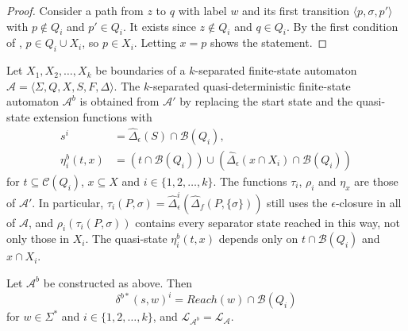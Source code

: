 \begin{proof}
  Consider a path from $z$ to $q$ with label $w$ and its first transition $\langle p, \sigma,
  p' \rangle$ with $p \not\in Q_i$ and $p' \in Q_i$. It exists since $z \not\in Q_i$ and $q
  \in Q_i$. By the first condition of , $p \in Q_i \cup X_i$, so $p \in
  X_i$. Letting $x = p$ shows the statement.
\end{proof}

Let $X_1, X_2, \ldots, X_k$ be boundaries of a $k$-separated finite-state automaton
$\mathcal{A} = \langle \Sigma, Q, X, S, F, \Delta \rangle$. The $k$-separated
quasi-deterministic finite-state automaton $\mathcal{A}^b$ is obtained from $\mathcal{A}'$ by
replacing the start state and the quasi-state extension functions with
\begin{align*}
  s^i &= \hat{\Delta}_\epsilon(S) \cap \mathcal{B}(Q_i),\\
  \eta_i^b(t, x) &= (t \cap \mathcal{B}(Q_i)) \cup (\hat{\Delta}_\epsilon(x \cap X_i) \cap
  \mathcal{B}(Q_i))
\end{align*}
for $t \subseteq \mathcal{C}(Q_i)$, $x \subseteq X$ and $i \in \{ 1, 2, \ldots, k \}$. The
functions $\tau_i$, $\rho_i$ and $\eta_x$ are those of $\mathcal{A}'$. In particular,
$\tau_i(P, \sigma) = \hat{\Delta}_\epsilon^i(\hat{\Delta}_f(P, \{ \sigma \}))$ still uses
the $\epsilon$-closure in all of $\mathcal{A}$, and $\rho_i(\tau_i(P, \sigma))$ contains every
separator state reached in this way, not only those in $X_i$. The quasi-state $\eta_i^b(t,
x)$ depends only on $t \cap \mathcal{B}(Q_i)$ and $x \cap X_i$.

\begin{lemma}\label{lem:boundary_invariant}
  Let $\mathcal{A}^b$ be constructed as above. Then
  \begin{equation*}
    \delta^{b*}(s, w)^i = Reach(w) \cap \mathcal{B}(Q_i)
  \end{equation*}
  for $w \in \Sigma^*$ and $i \in \{ 1, 2, \ldots, k \}$, and $\mathcal{L}_{\mathcal{A}^b} =
  \mathcal{L}_\mathcal{A}$.
\end{lemma}

